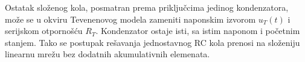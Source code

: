 Ostatak složenog kola, posmatran prema priključcima jedinog kondenzatora, može se u okviru Tevenenovog modela zameniti naponskim izvorom $u_T(t)$ i serijskom otpornošću $R_T$. Kondenzator ostaje isti, sa istim naponom i početnim stanjem. Tako se postupak rešavanja jednostavnog RC kola prenosi na složeniju linearnu mrežu bez dodatnih akumulativnih elemenata.
